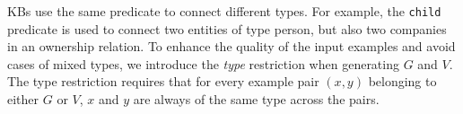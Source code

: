 \vspace{1ex}
KBs use the same predicate to connect different types. For example, the \texttt{child} predicate is used to connect two entities of type person, but also two companies in an ownership relation. To enhance the quality of the input examples and avoid cases of mixed types, we introduce the \emph{type} restriction when generating $G$ and $V$. The type restriction requires that for every example pair $(x,y)$ belonging to either $G$ or $V$, $x$ and $y$ are always of the same type across the pairs. 




